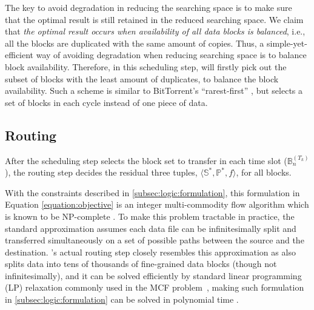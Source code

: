 The key to avoid degradation in reducing the searching space is to make sure that the optimal result is still retained in the reduced searching space. We claim that {\em the optimal result occurs when availability of all data blocks is balanced}, i.e., all the blocks are duplicated with the same amount of copies. Thus, a simple-yet-efficient way of avoiding degradation when reducing searching space is to balance block availability. Therefore, in this scheduling step, \name will firstly pick out the subset of blocks with the least amount of duplicates, to balance the block availability. Such a scheme is similar to BitTorrent's ``rarest-first'' \cite{Cohen2003Incentives}, but \name selects a set of blocks in each cycle instead of one piece of data.


\subsection{Routing}
\label{subsec:logic:routing}

After the scheduling step selects the block set to transfer in each time slot ($\mathbb{B}^{(T_k)}_n$), the routing step decides the residual three tuples, $\langle \mathbb{S}^*, \mathbb{P}^*, f \rangle$, for all blocks.

With the constraints described in \Section\ref{subsec:logic:formulation}, this formulation in Equation \ref{equation:objective} is an integer multi-commodity flow algorithm which is known to be NP-complete \cite{garg1997primal}.
To make this problem tractable in practice,
the standard approximation assumes each data file can be infinitesimally split and transferred simultaneously on a set of possible paths between the source and the destination.
\name's actual routing step closely resembles this approximation as \name also splits data into tens of thousands of fine-grained data blocks (though not infinitesimally), and it can be solved efficiently by standard linear programming (LP) relaxation commonly used in the MCF problem~\cite{garg2007faster},
making such formulation in \Section\ref{subsec:logic:formulation} can be solved in polynomial time \cite{reed2012traffic}.


